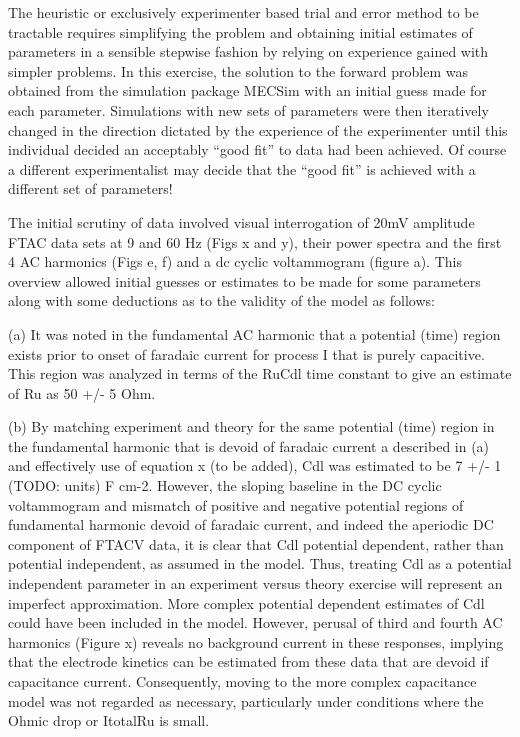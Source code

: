 \documentclass[a4paper, 12pt]{article}
\begin{document}
The heuristic or exclusively experimenter based trial and error method to be 
tractable requires simplifying the problem and obtaining initial estimates of 
parameters in a sensible stepwise fashion by relying on experience gained with 
simpler problems. In this exercise, the solution to the forward problem was 
obtained from the simulation package MECSim with an initial guess made for each 
parameter. Simulations with new sets of parameters were then iteratively changed 
in the direction dictated by the experience of the experimenter until this 
individual decided an acceptably “good fit” to data had been achieved. Of course 
a different experimentalist may decide that the “good fit” is achieved with a 
different set of parameters!


The initial scrutiny of data involved visual interrogation of   20mV amplitude 
FTAC data sets at 9 and 60 Hz (Figs x and y), their power spectra and the first 
4 AC harmonics (Figs e, f) and a dc cyclic voltammogram (figure a). This 
overview allowed initial guesses or estimates to be made for some parameters 
along with some deductions as to the validity of the model as follows:

(a)  It was noted in the fundamental AC harmonic that a potential (time) region exists prior to onset of faradaic current for process I that is purely capacitive.  This region was analyzed in terms of the RuCdl time constant to give an estimate of Ru as 50 +/- 5 Ohm. 

(b) By matching experiment and theory  for the same potential (time) region in 
the fundamental   harmonic that is devoid of faradaic current a described in (a) 
and effectively use of equation x (to be added), Cdl was estimated to be 7 +/- 1 
(TODO: units) F cm-2. However, the sloping baseline in  the DC cyclic 
voltammogram and mismatch of positive and negative potential regions of 
fundamental harmonic devoid of faradaic current, and indeed the aperiodic DC 
component of FTACV data, it is clear that Cdl  potential dependent, rather than 
potential independent, as assumed in the model. Thus, treating Cdl as a 
potential independent parameter in an experiment versus theory exercise will 
represent an imperfect approximation.  More complex potential dependent 
estimates of Cdl could have been included in the model. However, perusal of 
third and fourth AC harmonics (Figure x) reveals no background current in these 
responses, implying that the electrode kinetics can be estimated from these data 
that are devoid if capacitance current.  Consequently, moving to the more 
complex capacitance model was not regarded as necessary, particularly under 
conditions where the Ohmic drop or ItotalRu is small.
\end{document}
